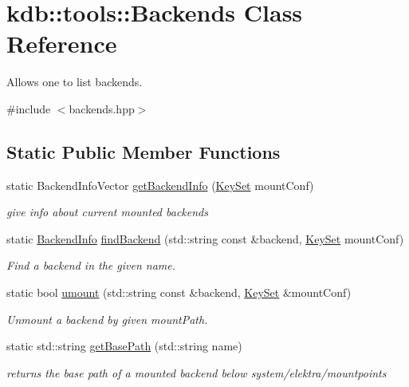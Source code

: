 \hypertarget{classkdb_1_1tools_1_1Backends}{\section{kdb\+:\+:tools\+:\+:Backends Class Reference}
\label{classkdb_1_1tools_1_1Backends}
}


Allows one to list backends.  




{\ttfamily \#include $<$backends.\+hpp$>$}

\subsection*{Static Public Member Functions}
\begin{DoxyCompactItemize}
\item 
static Backend\+Info\+Vector \hyperlink{classkdb_1_1tools_1_1Backends_a82b334d8a1e01df664462c6dd43bd7e1}{get\+Backend\+Info} (\hyperlink{classkdb_1_1KeySet}{Key\+Set} mount\+Conf)
\begin{DoxyCompactList}\small\item\em give info about current mounted backends \end{DoxyCompactList}\item 
static \hyperlink{structkdb_1_1tools_1_1BackendInfo}{Backend\+Info} \hyperlink{classkdb_1_1tools_1_1Backends_a12ba74eaa70f5be9f39a1814dd61e85e}{find\+Backend} (std\+::string const \&backend, \hyperlink{classkdb_1_1KeySet}{Key\+Set} mount\+Conf)
\begin{DoxyCompactList}\small\item\em Find a backend in the given name. \end{DoxyCompactList}\item 
static bool \hyperlink{classkdb_1_1tools_1_1Backends_aca36f903059e3df0f2ded569d6d8df8c}{umount} (std\+::string const \&backend, \hyperlink{classkdb_1_1KeySet}{Key\+Set} \&mount\+Conf)
\begin{DoxyCompactList}\small\item\em Unmount a backend by given mount\+Path. \end{DoxyCompactList}\item 
static std\+::string \hyperlink{classkdb_1_1tools_1_1Backends_a76af9122c56426f4d0119e44719c7309}{get\+Base\+Path} (std\+::string name)
\begin{DoxyCompactList}\small\item\em returns the base path of a mounted backend below system/elektra/mountpoints \end{DoxyCompactList}\end{DoxyCompactItemize}
